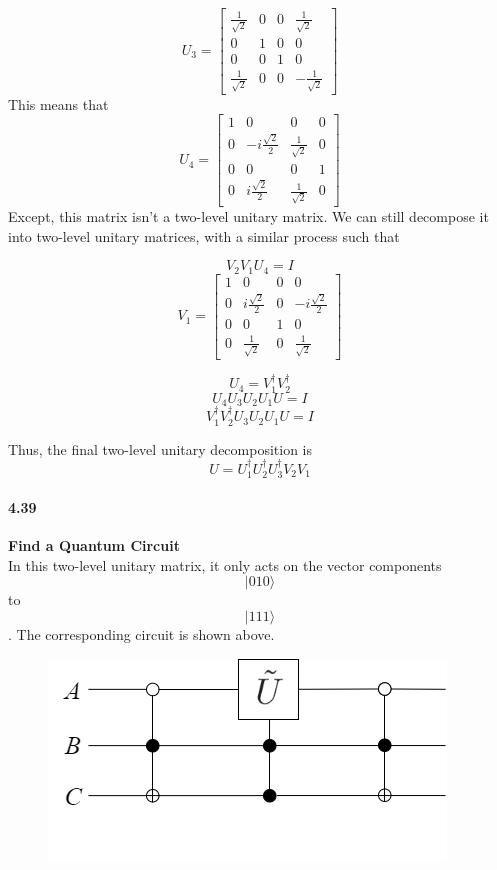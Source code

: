 $$U_3 = \begin{bmatrix} \frac{1}{\sqrt{2}}& 0 & 0 & \frac{1}{\sqrt{2}} \\
0 & 1 & 0 & 0 \\
0 & 0 & 1 & 0 \\
\frac{1}{\sqrt{2}} & 0 & 0 & -\frac{1}{\sqrt{2}} \end{bmatrix}$$
This means that 
$$U_4 = \begin{bmatrix}1 & 0 & 0 & 0 \\
0 & -i\frac{\sqrt{2}}{2} & \frac{1}{\sqrt{2}} & 0 \\
0 & 0 & 0 & 1 \\
0 & i\frac{\sqrt{2}}{2} & \frac{1}{\sqrt{2}} & 0 \end{bmatrix}$$ 
Except, this matrix isn’t a two-level unitary matrix. We can still decompose it into two-level unitary matrices, with a similar process such that


$$V_2V_1U_4 = I$$
$$V_1 = \begin{bmatrix}1 & 0 & 0 & 0 \\
0 & i\frac{\sqrt{2}}{2} & 0 & -i\frac{\sqrt{2}}{2} \\
0 & 0 & 1 & 0 \\
0 & \frac{1}{\sqrt{2}} & 0 & \frac{1}{\sqrt{2}} \end{bmatrix}$$   

$$U_4 = V_1^{\dagger} V_2^{\dagger}$$
$$U_4U_3U_2U_1U = I$$
$$V_1^{\dagger} V_2^{\dagger}U_3U_2U_1U = I$$



Thus, the final two-level unitary decomposition is $$U = U_1^{\dagger}U_2^{\dagger}U_3^{\dagger}V_2V_1$$

\paragraph{4.39} \textbf{Find a Quantum Circuit}
\\

In this two-level unitary matrix, it only acts on the vector components $$|010\rangle$$ to $$|111\rangle$$. The corresponding circuit is shown above.

\begin{figure}[h!]
    \centering
    \includegraphics{Chapter 4/4.39.png}
    
    \label{fig:my_label}
\end{figure}


